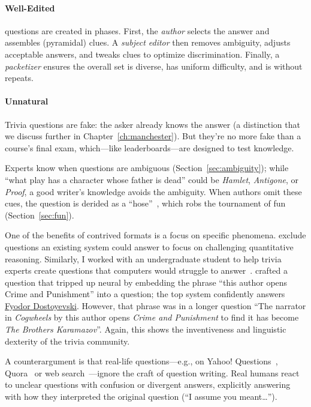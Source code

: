 \paragraph{Well-Edited}

\qb{} questions are created in phases.
First, the \emph{author} selects the answer and assembles (pyramidal) clues.
A \emph{subject editor} then removes ambiguity, adjusts acceptable answers, and tweaks clues to optimize discrimination.
Finally, a \emph{packetizer} ensures the overall set is diverse, has uniform difficulty, and is without repeats.

\paragraph{Unnatural}
\label{sec:unnatural}

Trivia questions are fake: the asker already knows the answer (a distinction that we discuss further in Chapter~\ref{ch:manchester}).
But they're no more fake than a course's final exam, which---like leaderboards---are designed to test knowledge.

Experts know when questions are ambiguous (Section~\ref{sec:ambiguity}); while ``what play has a character whose father is dead'' could be \textit{Hamlet}, \textit{Antigone}, or \textit{Proof}, a good writer's knowledge avoids the ambiguity.
When authors omit these cues, the question is derided as a ``hose''~\cite{2013-eltinge}, which robs the tournament of fun (Section~\ref{sec:fun}).

One of the benefits of contrived formats is a focus on specific phenomena.
 exclude questions an existing  system could answer to focus on challenging quantitative reasoning.
Similarly, I worked with an undergraduate student to help trivia experts create questions that computers would struggle to answer~\cite{wallace-19}. crafted a question that tripped up neural  by embedding the phrase ``this author opens Crime and Punishment'' into a question; the top system confidently answers \underline{Fyodor Dostoyevski}.
However, that phrase was in a longer question ``The narrator in \textit{Cogwheels} by this author opens \textit{Crime and Punishment} to find it has become \textit{The Brothers Karamazov}''.
Again, this shows the inventiveness and linguistic dexterity of the trivia community.

A counterargument is that real-life questions---e.g., on Yahoo!
Questions~\cite{szpektor-13}, Quora~\cite{iyer-17} or web
search~\cite{kwiatkowski-19}---ignore the craft of question writing.
Real humans react to unclear questions with confusion or divergent
answers, explicitly answering with how they interpreted the original
question (``I assume you meant\dots'').

